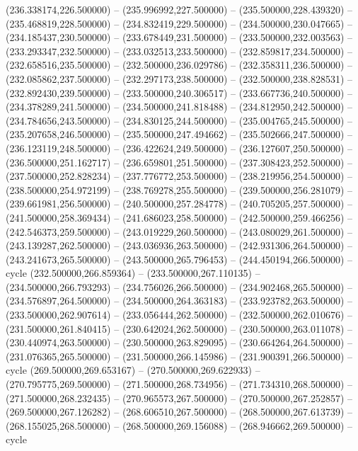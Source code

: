 (236.338174,226.500000) -- (235.996992,227.500000) -- (235.500000,228.439320) -- (235.468819,228.500000) -- (234.832419,229.500000) -- (234.500000,230.047665) -- (234.185437,230.500000) -- (233.678449,231.500000) -- (233.500000,232.003563) -- (233.293347,232.500000) -- (233.032513,233.500000) -- (232.859817,234.500000) -- (232.658516,235.500000) -- (232.500000,236.029786) -- (232.358311,236.500000) -- (232.085862,237.500000) -- (232.297173,238.500000) -- (232.500000,238.828531) -- (232.892430,239.500000) -- (233.500000,240.306517) -- (233.667736,240.500000) -- (234.378289,241.500000) -- (234.500000,241.818488) -- (234.812950,242.500000) -- (234.784656,243.500000) -- (234.830125,244.500000) -- (235.004765,245.500000) -- (235.207658,246.500000) -- (235.500000,247.494662) -- (235.502666,247.500000) -- (236.123119,248.500000) -- (236.422624,249.500000) -- (236.127607,250.500000) -- (236.500000,251.162717) -- (236.659801,251.500000) -- (237.308423,252.500000) -- (237.500000,252.828234) -- (237.776772,253.500000) -- (238.219956,254.500000) -- (238.500000,254.972199) -- (238.769278,255.500000) -- (239.500000,256.281079) -- (239.661981,256.500000) -- (240.500000,257.284778) -- (240.705205,257.500000) -- (241.500000,258.369434) -- (241.686023,258.500000) -- (242.500000,259.466256) -- (242.546373,259.500000) -- (243.019229,260.500000) -- (243.080029,261.500000) -- (243.139287,262.500000) -- (243.036936,263.500000) -- (242.931306,264.500000) -- (243.241673,265.500000) -- (243.500000,265.796453) -- (244.450194,266.500000) -- cycle
   (232.500000,266.859364) -- (233.500000,267.110135) -- (234.500000,266.793293) -- (234.756026,266.500000) -- (234.902468,265.500000) -- (234.576897,264.500000) -- (234.500000,264.363183) -- (233.923782,263.500000) -- (233.500000,262.907614) -- (233.056444,262.500000) -- (232.500000,262.010676) -- (231.500000,261.840415) -- (230.642024,262.500000) -- (230.500000,263.011078) -- (230.440974,263.500000) -- (230.500000,263.829095) -- (230.664264,264.500000) -- (231.076365,265.500000) -- (231.500000,266.145986) -- (231.900391,266.500000) -- cycle
   (269.500000,269.653167) -- (270.500000,269.622933) -- (270.795775,269.500000) -- (271.500000,268.734956) -- (271.734310,268.500000) -- (271.500000,268.232435) -- (270.965573,267.500000) -- (270.500000,267.252857) -- (269.500000,267.126282) -- (268.606510,267.500000) -- (268.500000,267.613739) -- (268.155025,268.500000) -- (268.500000,269.156088) -- (268.946662,269.500000) -- cycle
